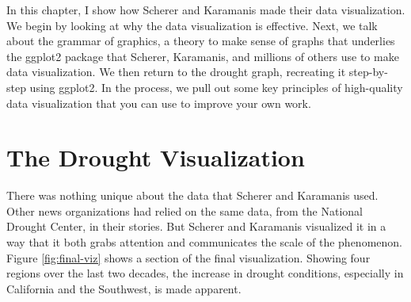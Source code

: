\documentclass[
]{book}
\begin{document}
In this chapter, I show how Scherer and Karamanis made their data visualization. We begin by looking at why the data visualization is effective. Next, we talk about the grammar of graphics, a theory to make sense of graphs that underlies the ggplot2 package that Scherer, Karamanis, and millions of others use to make data visualization. We then return to the drought graph, recreating it step-by-step using ggplot2. In the process, we pull out some key principles of high-quality data visualization that you can use to improve your own work.

\hypertarget{the-drought-visualization}{%
\section*{The Drought Visualization}\label{the-drought-visualization}}

There was nothing unique about the data that Scherer and Karamanis used. Other news organizations had relied on the same data, from the National Drought Center, in their stories. But Scherer and Karamanis visualized it in a way that it both grabs attention and communicates the scale of the phenomenon. Figure \ref{fig:final-viz} shows a section of the final visualization. Showing four regions over the last two decades, the increase in drought conditions, especially in California and the Southwest, is made apparent.
\end{document}
